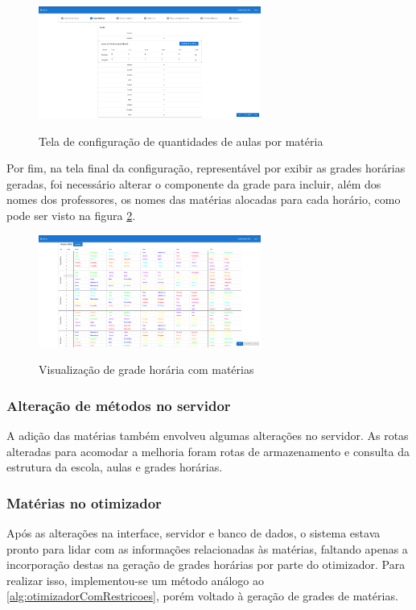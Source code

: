 \begin{figure}[!htb]
	\centering
	\caption{Tela de configuração de quantidades de aulas por matéria}
	\includegraphics[width=0.65\textwidth]{./dados/figuras/alteracaoAulas}
	\label{fig:alteracaoAulas}
\end{figure}

Por fim, na tela final da configuração, representável por exibir as grades horárias geradas, foi necessário alterar o componente da grade para incluir, além dos nomes dos professores, os nomes das matérias alocadas para cada horário, como pode ser visto na figura \ref{fig:alteracaoHorario}.

\begin{figure}[!htb]
	\centering
	\caption{Visualização de grade horária com matérias}
	\includegraphics[width=0.65\textwidth]{./dados/figuras/alteracaoHorarios}
	\label{fig:alteracaoHorario}
\end{figure}

\subsubsection{Alteração de métodos no servidor}
A adição das matérias também envolveu algumas alterações no servidor. As rotas alteradas para acomodar a melhoria foram rotas de armazenamento e consulta da estrutura da escola, aulas e grades horárias.

\subsubsection{Matérias no otimizador}
Após as alterações na interface, servidor e banco de dados, o sistema estava pronto para lidar com as informações relacionadas às matérias, faltando apenas a incorporação destas na geração de grades horárias por parte do otimizador. Para realizar isso, implementou-se um método análogo ao \autoref{alg:otimizadorComRestricoes}, porém voltado à geração de grades de matérias.

